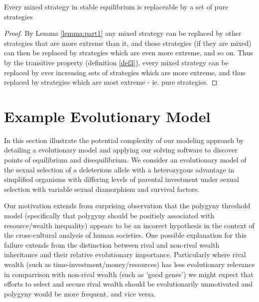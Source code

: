\begin{Theorem}\label{the_proof}
Every mixed strategy in stable equilibrium is replaceable by a set of pure strategies 
\end{Theorem}
\begin{proof}
By Lemma \ref{lemma:part1} any mixed strategy can be replaced by other strategies that are more extreme than it, and those strategies (if they are mixed) can then be replaced by strategies which are even more extreme, and so on.
Thus by the transitive property (definition \ref{def3}), every mixed strategy can be replaced by ever increasing sets of strategies which are more extreme, and thus replaced by strategies which are most extreme - ie. pure strategies.
\end{proof}


\section{Example Evolutionary Model}

In this section illustrate the potential complexity of our modeling approach by detailing a evolutionary model and applying our solving software to discover points of equilibrium and disequilibrium.
We consider an evolutionary model of the sexual selection of a deleterious allele with a heterozygous advantage in simplified organisms with differing levels of parental investment under sexual selection with variable sexual diamorphism and survival factors.

Our motivation extends from surprising observation that the polygyny threshold model (specifically that polygyny should be positiely associated with resource/wealth inequality) appears to be an incorect hypothesis in the context of the cross-cultural analysis of human societies. \cite{item_2631714}
One possible explanation for this failure \cite{item_2631714} extends from the distinction between rival and non-rival wealth inheritance and their relative evolutionary importance.
Particularly where rival wealth (such as time-investment/money/resources) has less evolutionary relevance in comparrison with non-rival wealth (such as 'good genes') we might expect that efforts to select and secure rival wealth should be evolutionarily unmotivated and polygyny would be more frequent, and vice versa.

